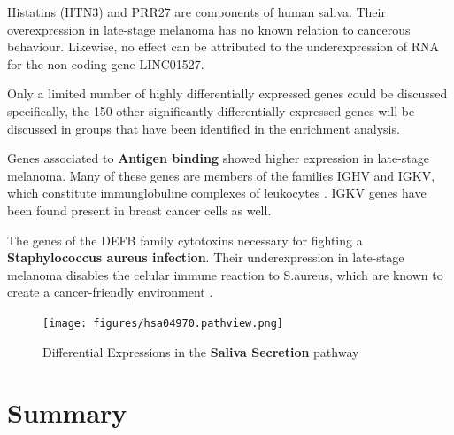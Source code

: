 \documentclass[twoside]{article}
\begin{document}
Histatins (HTN3) and PRR27 are components of human saliva. Their overexpression in late-stage melanoma has no known relation to cancerous behaviour. Likewise, no effect can be attributed to the underexpression of RNA for the non-coding gene LINC01527.

Only a limited number of highly differentially expressed genes could be discussed specifically, the 150 other significantly differentially expressed genes will be discussed in groups that have been identified in the enrichment analysis.

Genes associated to \textbf{Antigen binding} showed higher expression in late-stage melanoma. Many of these genes are members of the families IGHV and IGKV, which constitute immunglobuline complexes of leukocytes \cite{IGKV}. IGKV genes have been found present in breast cancer cells as well. 

The genes of the DEFB family cytotoxins necessary for fighting a \textbf{Staphylococcus aureus infection}. Their underexpression in late-stage melanoma disables the celular immune reaction to S.aureus, which are known to create a cancer-friendly environment \cite{Staph}. 




\begin{figure}[h]
    \centering
    \texttt{[image: figures/hsa04970.pathview.png]}
    \caption{Differential Expressions in the \textbf{Saliva Secretion} pathway}
    \label{fig:pathviw}
\end{figure}

\section{Summary}
\end{document}
